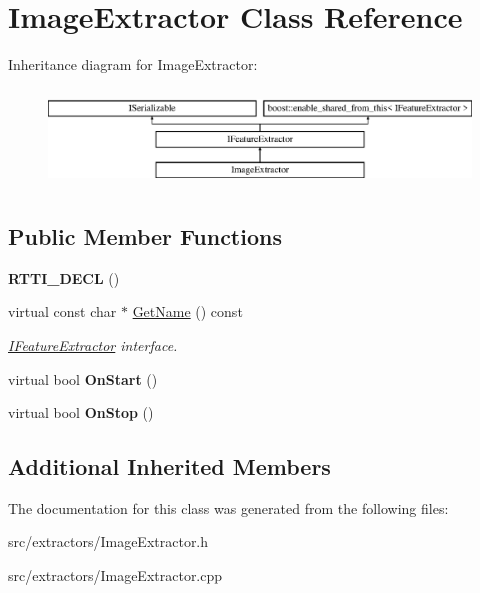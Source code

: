 \hypertarget{class_image_extractor}{}\section{Image\+Extractor Class Reference}
\label{class_image_extractor}
Inheritance diagram for Image\+Extractor\+:\begin{figure}[H]
\begin{center}
\leavevmode
\includegraphics[height=2.625000cm]{class_image_extractor}
\end{center}
\end{figure}
\subsection*{Public Member Functions}
\begin{DoxyCompactItemize}
\item 
\mbox{\label{class_image_extractor_a163c9ac81fd5eb108d6f602a51ed9b8a}} 
{\bfseries R\+T\+T\+I\+\_\+\+D\+E\+CL} ()
\item 
\mbox{\label{class_image_extractor_a2441a052cf33b5b4f663eb75cdebcf47}} 
virtual const char $\ast$ \hyperlink{class_image_extractor_a2441a052cf33b5b4f663eb75cdebcf47}{Get\+Name} () const
\begin{DoxyCompactList}\small\item\em \hyperlink{class_i_feature_extractor}{I\+Feature\+Extractor} interface. \end{DoxyCompactList}\item 
\mbox{\label{class_image_extractor_a409f3ce1e96344df80e704b44d354859}} 
virtual bool {\bfseries On\+Start} ()
\item 
\mbox{\label{class_image_extractor_a6ddbe06a3114783c3c901f9da516dd55}} 
virtual bool {\bfseries On\+Stop} ()
\end{DoxyCompactItemize}
\subsection*{Additional Inherited Members}


The documentation for this class was generated from the following files\+:\begin{DoxyCompactItemize}
\item 
src/extractors/Image\+Extractor.\+h\item 
src/extractors/Image\+Extractor.\+cpp\end{DoxyCompactItemize}
